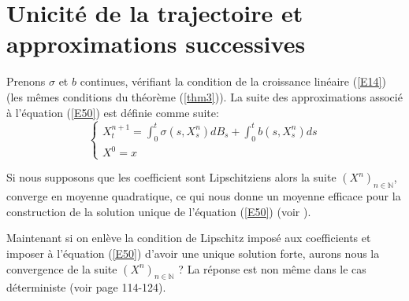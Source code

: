 \documentclass[A4paper,12pt]{report}
\newcommand{\N}{{\mathbb{N}}}
\begin{document}
\section{Unicité de la trajectoire et approximations successives }
Prenons $\sigma$ et $b$ continues, vérifiant la condition de la croissance linéaire (\ref{E14}) (les mêmes conditions du théorème (\ref{thm3})). La suite des approximations associé à l'équation 
(\ref{E50}) est définie comme suite:\\ 
\begin{equation}\label{E15}
\left\{\begin{array}{l}
X_{t}^{n+1}=\int_{0}^{t} \sigma\left(s, X_{s}^{n}\right) d B_{s}+\int_{0}^{t} b\left(s, X_{s}^{n}\right) d s \\
X^{0}=x
\end{array}\right.
\end{equation}

Si nous supposons que les coefficient sont Lipschitziens alors la suite $(X^n)_{n \in \N}$, converge en moyenne quadratique, ce qui nous donne un moyenne efficace pour la construction de la solution unique de l'équation (\ref{E50}) (voir \cite{Ikeda}). 

Maintenant si on enlève la condition de Lipschitz imposé aux coefficients et imposer à l'équation (\ref{E50}) d'avoir une unique solution forte, aurons nous la convergence de la suite $(X^n)_{n \in \N}$ ? La réponse est non même dans le cas déterministe (voir \cite{Dieudonné} page 114-124).
\end{document}
